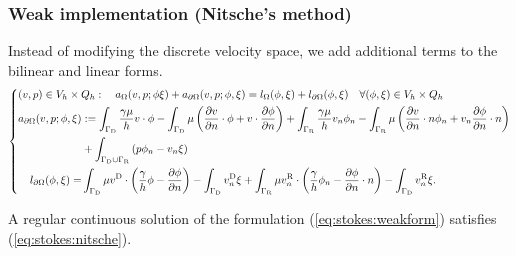 \subsubsection{Weak implementation (Nitsche's method)}
%
%
Instead of modifying the discrete velocity space, we add additional terms to the bilinear and linear forms.
%
\begin{equation}\label{eq:stokes:nitsche}
%
\left\{
\begin{aligned}
&(v,p)\in V_h\times Q_h:\quad a_{\Omega}(v,p; \phi\xi) + a_{\partial\Omega}(v,p; \phi,\xi) = l_{\Omega}(\phi,\xi)+l_{\partial\Omega}(\phi,\xi) \quad\forall (\phi,\xi)\in V_h\times Q_h\\
&\begin{aligned}
 a_{\partial\Omega}(v,p; \phi,\xi) &:= \int_{\GammaD}\frac{\gamma\mu}{h}v\cdot\phi - 
 \int_{\GammaD}\mu \left(  \dn{v}\cdot  \phi + v  \cdot \dn{\phi}\right)
 +\int_{\GammaR}\frac{\gamma\mu}{h}v_n\phi_n
- \int_{\GammaR} \mu\left( \dn{v}\cdot n \phi_n + v_n\dn{\phi}\cdot n \right)\\
&+ \int_{\GammaD\cup\GammaR} \left( p\phi_n - v_n\xi\right)
 \\
 l_{\partial\Omega}(\phi,\xi) =& \int_{\GammaD}\mu\vD\cdot\left( \frac{\gamma}{h}\phi - \dn{\phi}\right)- \int_{\GammaD}\vD_n\xi
+ \int_{\GammaR}\mu\vn\cdot\left( \frac{\gamma}{h}\phi_n - \dn{\phi}\cdot n\right)- \int_{\GammaD}\vn\xi.
\end{aligned}
\end{aligned}
\right.
%
\end{equation}
%
%
\begin{lemma}\label{lemma:}
A regular continuous solution of the formulation (\ref{eq:stokes:weakform}) satisfies (\ref{eq:stokes:nitsche}).
\end{lemma}
%
